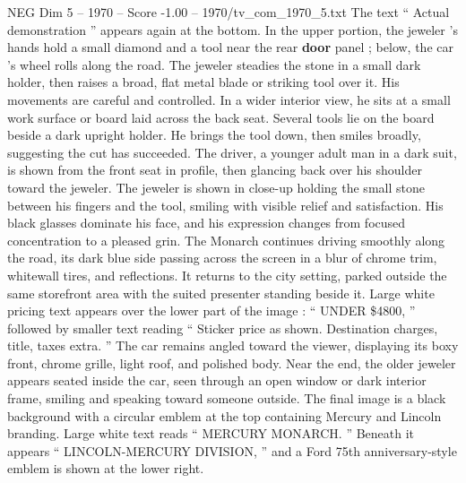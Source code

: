 \begin{textsample}{NEG Dim 5 – 1970 – Score -1.00 – 1970/tv\_com\_1970\_5.txt}
The text “ Actual demonstration ” appears again at the bottom.
In the upper portion, the jeweler ’s hands hold a small diamond and a tool near the rear \textbf{door} panel ; below, the car ’s wheel rolls along the road.
The jeweler steadies the stone in a small dark holder, then raises a broad, flat metal blade or striking tool over it.
His movements are careful and controlled.
In a wider interior view, he sits at a small work surface or board laid across the back seat.
Several tools lie on the board beside a dark upright holder.
He brings the tool down, then smiles broadly, suggesting the cut has succeeded.
The driver, a younger adult man in a dark suit, is shown from the front seat in profile, then glancing back over his shoulder toward the jeweler.
The jeweler is shown in close-up holding the small stone between his fingers and the tool, smiling with visible relief and satisfaction.
His black glasses dominate his face, and his expression changes from focused concentration to a pleased grin.
The Monarch continues driving smoothly along the road, its dark blue side passing across the screen in a blur of chrome trim, whitewall tires, and reflections.
It returns to the city setting, parked outside the same storefront area with the suited presenter standing beside it.
Large white pricing text appears over the lower part of the image : “ UNDER \$4800, ” followed by smaller text reading “ Sticker price as shown.
Destination charges, title, taxes extra. ” The car remains angled toward the viewer, displaying its boxy front, chrome grille, light roof, and polished body.
Near the end, the older jeweler appears seated inside the car, seen through an open window or dark interior frame, smiling and speaking toward someone outside.
The final image is a black background with a circular emblem at the top containing Mercury and Lincoln branding.
Large white text reads “ MERCURY MONARCH. ” Beneath it appears “ LINCOLN-MERCURY DIVISION, ” and a Ford 75th anniversary-style emblem is shown at the lower right.

\end{textsample}
